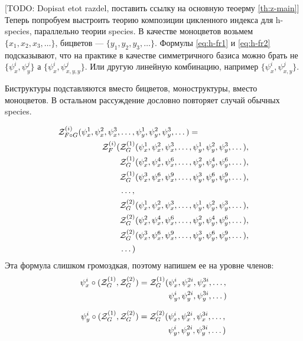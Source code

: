 [TODO: Dopisat etot razdel, поставить ссылку на основную теоерму \ref{th:z-main}]
Теперь попробуем выстроить теорию композиции цикленного индекса для h-species,
параллельно теории species. В качестве моноцветов возьмем $\{x_1, x_2, x_3,
\dots\}$, бицветов --- $\{y_1, y_2, y_3, \dots\}$. Формулы \ref{eq:h-fr1} и
\ref{eq:h-fr2} подсказывают, что на практике в качестве симметричного базиса
можно брать не $\{\psi_x^i, \psi_y^j\}$ а $\{\psi_x^i, \psi_{x,y,y}^j\}$. Или
другую линейную комбинацию, например $\{\psi_x^i, \psi_{x,y}^j\}$.


Биструктуры подставляются вместо бицветов, моноструктуры, вместо моноцветов. В
остальном рассуждение дословно повторяет случай обычных species.

\begin{theorem}
\label{th:z-main}
\begin{equation}
\begin{split}
\label{eq:h-zfg}
	\mathcal Z^{(i)}_{F \circ G} (\psi_x^1, \psi_x^2, \psi_x^3, &\dots, 
	\psi_y^1, \psi_y^2, \psi_y^3, \dots) = \\
	\mathcal Z_F^{(i)}(
		&\mathcal Z^{(1)}_G(\psi_x^1, \psi_x^2, \psi_x^3, \dots, 
					 \psi_y^1, \psi_y^2, \psi_y^3, \dots), \\
		&\mathcal Z^{(1)}_G(\psi_x^2, \psi_x^4, \psi_x^6, \dots, 
					 \psi_y^2, \psi_y^4, \psi_y^6, \dots), \\
		&\mathcal Z^{(1)}_G(\psi_x^3, \psi_x^6, \psi_x^9, \dots, 
					 \psi_y^3, \psi_y^6, \psi_y^9, \dots), \\
		&\dots, \\
		&\mathcal Z^{(2)}_G(\psi_x^1, \psi_x^2, \psi_x^3, \dots, 
					 \psi_y^1, \psi_y^2, \psi_y^3, \dots), \\
		&\mathcal Z^{(2)}_G(\psi_x^2, \psi_x^4, \psi_x^6, \dots, 
					 \psi_y^2, \psi_y^4, \psi_y^6, \dots), \\
		&\mathcal Z^{(2)}_G(\psi_x^3, \psi_x^6, \psi_x^9, \dots, 
					 \psi_y^3, \psi_y^6, \psi_y^9, \dots), \\
		&\dots
	)
\end{split}	
\end{equation}
Эта формула слишком громоздкая, поэтому напишем ее на уровне членов:
\begin{equation*}
\begin{split}
\psi_x^i \circ (\mathcal Z^{(1)}_G, \mathcal Z^{(2)}_G ) = \mathcal Z^{(1)}_G
(&\psi_x^i, \psi_x^{2i}, \psi_x^{3i}, \dots, \\
&\psi_y^i, \psi_y^{2i}, \psi_y^{3i}, \dots)
\end{split}
\end{equation*}

\begin{equation*}
\begin{split}
\psi_y^i \circ (\mathcal Z^{(1)}_G, \mathcal Z^{(2)}_G ) = \mathcal Z^{(2)}_G
(&\psi_x^i, \psi_x^{2i}, \psi_x^{3i}, \dots, \\
&\psi_y^i, \psi_y^{2i}, \psi_y^{3i}, \dots)
\end{split}
\end{equation*}
\end{theorem}

